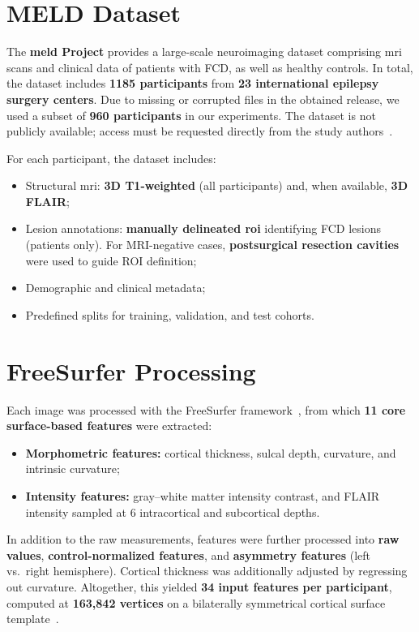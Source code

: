 \documentclass[FCD_GNN.tex]{subfiles}
\begin{document}
\section{MELD Dataset}
The \textbf{\ac{meld} Project} provides a large-scale neuroimaging dataset comprising \ac{mri} scans and clinical data of patients with FCD, as well as healthy controls. 
In total, the dataset includes \textbf{1185 participants} from \textbf{23 international epilepsy surgery centers}. 
Due to missing or corrupted files in the obtained release, we used a subset of \textbf{960 participants} in our experiments. 
The dataset is not publicly available; access must be requested directly from the study authors~\cite{Ripart2025MELD}.

For each participant, the dataset includes:
\begin{itemize}
    \item Structural \ac{mri}: \textbf{3D T1-weighted} (all participants) and, when available, \textbf{3D FLAIR};
    \item Lesion annotations: \textbf{manually delineated \ac{roi}} identifying FCD lesions (patients only). For MRI-negative cases, \textbf{postsurgical resection cavities} were used to guide ROI definition;
    \item Demographic and clinical metadata;
    \item Predefined splits for training, validation, and test cohorts.
\end{itemize}

\section{FreeSurfer Processing}
Each image was processed with the FreeSurfer framework~\cite{Fischl2012FreeSurfer}, from which \textbf{11 core surface-based features} were extracted:
\begin{itemize}
    \item \textbf{Morphometric features:} cortical thickness, sulcal depth, curvature, and intrinsic curvature;
    \item \textbf{Intensity features:} gray–white matter intensity contrast, and FLAIR intensity sampled at 6 intracortical and subcortical depths.
\end{itemize}

In addition to the raw measurements, features were further processed into 
\textbf{raw values}, \textbf{control-normalized features}, and \textbf{asymmetry features} 
(left vs.~right hemisphere). Cortical thickness was additionally adjusted by regressing out curvature. 
Altogether, this yielded \textbf{34 input features per participant}, computed at \textbf{163{,}842 vertices} 
on a bilaterally symmetrical cortical surface template~\cite{Ripart2025MELD}.
\end{document}
